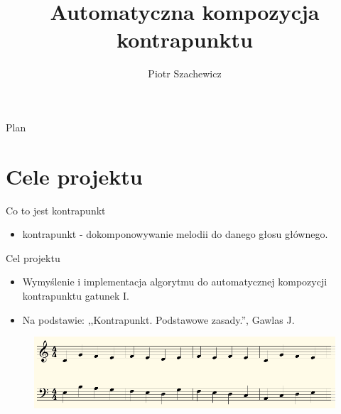 \documentclass{beamer}
\title %
{Automatyczna kompozycja kontrapunktu}
\author %
{Piotr Szachewicz}
\begin{document}
\begin{frame}
  \titlepage
\end{frame}

\begin{frame}{Plan}
  \tableofcontents
\end{frame}





\section{Cele projektu}

\begin{frame}{Co to jest kontrapunkt}

  \begin{itemize}
  	\item kontrapunkt - dokomponowywanie melodii do danego głosu głównego.
  \end{itemize}
\end{frame}

\begin{frame}{Cel projektu}
	\begin{itemize}
		\item Wymyślenie i implementacja algorytmu do automatycznej kompozycji kontrapunktu gatunek I.
		\item Na podstawie: ,,Kontrapunkt. Podstawowe zasady.'', Gawlas J. 
	\end{itemize}

	\begin{figure}
	   \includegraphics[scale=0.3]{nuty.png}
	\end{figure}
\end{frame}
\end{document}
